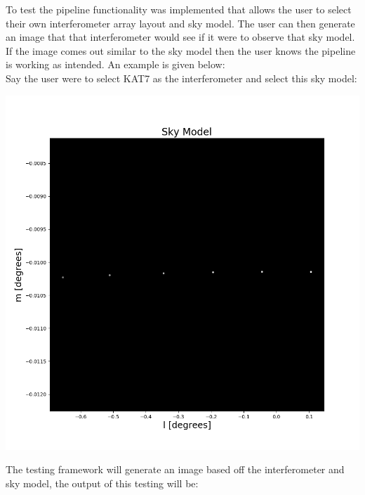 To test the pipeline functionality was implemented that allows the user to select their own interferometer array layout and sky model. The user can then generate an image that that interferometer would see if it were to observe that sky model. If the image comes out similar to the sky model then the user knows the pipeline is working as intended. An example is given below: \\
Say the user were to select KAT7 as the interferometer and select this sky model: 
\begin{center}
    \includegraphics[scale=0.35]{images/SkyModel.png}
\end{center}
The testing framework will generate an image based off the interferometer and sky model, the output of this testing will be:
